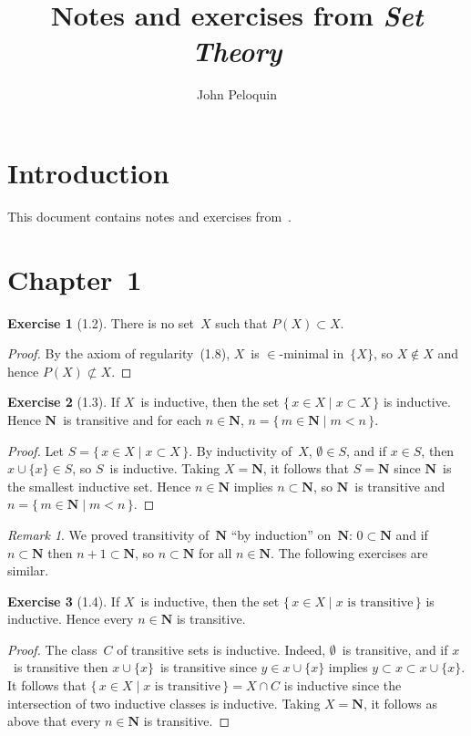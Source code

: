 \documentclass[letterpaper,12pt]{article}
\title{Notes and exercises from \textit{Set Theory}}
\author{John Peloquin}
\date{}
\newcommand{\N}{\boldsymbol{N}}
\renewcommand{\P}{P}
\newcommand{\union}{\cup}
\newcommand{\sect}{\cap}
\newcommand{\suc}[1]{#1\union\{#1\}}
\theoremstyle{definition}
\newtheorem*{exer}{Exercise}
\theoremstyle{remark}
\newtheorem*{rmk}{Remark}
\begin{document}
\maketitle

\section*{Introduction}
This document contains notes and exercises from~\cite{jech}.

\section*{Chapter~1}
\begin{exer}[1.2]
There is no set~\(X\) such that \(\P(X)\subset X\).
\end{exer}
\begin{proof}
By the axiom of regularity~(1.8), \(X\)~is \(\in\)-minimal in~\(\{X\}\), so \(X\not\in X\) and hence \(\P(X)\not\subset X\).
\end{proof}

\begin{exer}[1.3]
If \(X\)~is inductive, then the set \(\{\,x\in X\mid x\subset X\,\}\) is inductive. Hence \(\N\)~is transitive and for each \(n\in\N\), \(n=\{\,m\in\N\mid m<n\,\}\).
\end{exer}
\begin{proof}
Let \(S=\{\,x\in X\mid x\subset X\,\}\). By inductivity of~\(X\), \(\emptyset\in S\), and if \(x\in S\), then \(\suc{x}\in S\), so \(S\)~is inductive. Taking \(X=\N\), it follows that \(S=\N\) since \(\N\)~is the smallest inductive set. Hence \(n\in\N\) implies \(n\subset\N\), so \(\N\)~is transitive and \(n=\{\,m\in\N\mid m<n\,\}\).
\end{proof}
\begin{rmk}
We proved transitivity of~\(\N\) ``by induction'' on~\(\N\): \(0\subset\N\) and if \(n\subset\N\) then \(n+1\subset\N\), so \(n\subset\N\) for all \(n\in\N\). The following exercises are similar.
\end{rmk}

\begin{exer}[1.4]
If \(X\)~is inductive, then the set \(\{\,x\in X\mid x\text{ is transitive}\,\}\) is inductive. Hence every \(n\in\N\) is transitive.
\end{exer}
\begin{proof}
The class~\(C\) of transitive sets is inductive. Indeed, \(\emptyset\)~is transitive, and if \(x\)~is transitive then \(\suc{x}\)~is transitive since \(y\in\suc{x}\) implies \(y\subset x\subset\suc{x}\). It follows that \(\{\,x\in X\mid x\text{ is transitive}\,\}=X\sect C\) is inductive since the intersection of two inductive classes is inductive. Taking \(X=\N\), it follows as above that every \(n\in\N\) is transitive.
\end{proof}
\end{document}
